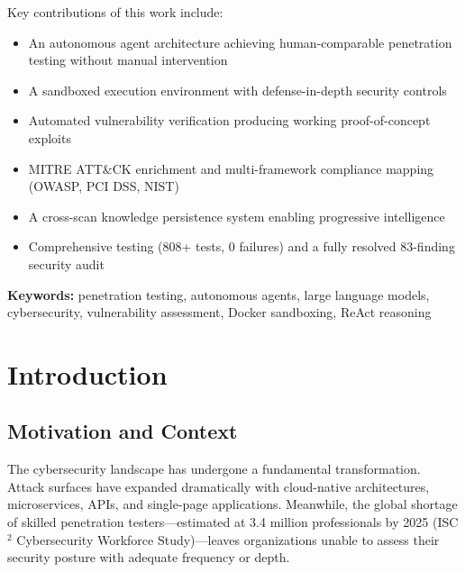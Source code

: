 \documentclass[12pt,a4paper,twoside]{report}
\begin{document}
Key contributions of this work include:
\begin{itemize}[leftmargin=2em]
    \item An autonomous agent architecture achieving human-comparable penetration testing without manual intervention
    \item A sandboxed execution environment with defense-in-depth security controls
    \item Automated vulnerability verification producing working proof-of-concept exploits
    \item MITRE ATT\&CK enrichment and multi-framework compliance mapping (OWASP, PCI DSS, NIST)
    \item A cross-scan knowledge persistence system enabling progressive intelligence
    \item Comprehensive testing (808+ tests, 0 failures) and a fully resolved 83-finding security audit
\end{itemize}

\textbf{Keywords:} penetration testing, autonomous agents, large language models, cybersecurity, vulnerability assessment, Docker sandboxing, ReAct reasoning

\newpage
{}

\chapter{Introduction}
\label{ch:introduction}

\section{Motivation and Context}

The cybersecurity landscape has undergone a fundamental transformation. Attack surfaces have expanded dramatically with cloud-native architectures, microservices, APIs, and single-page applications. Meanwhile, the global shortage of skilled penetration testers---estimated at 3.4 million professionals by 2025 (ISC$^2$ Cybersecurity Workforce Study)---leaves organizations unable to assess their security posture with adequate frequency or depth.
\end{document}
